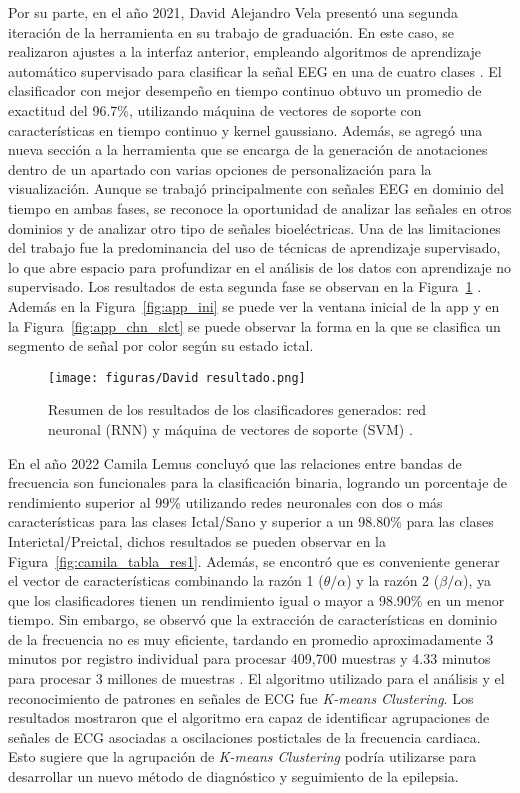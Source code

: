Por su parte, en el año 2021, David Alejandro Vela presentó una segunda iteración de la herramienta en su trabajo de graduación. En este caso, se realizaron ajustes a la interfaz anterior, empleando algoritmos de aprendizaje automático supervisado para clasificar la señal EEG en una de cuatro clases \cite{david_2022}. El clasificador con mejor desempeño en tiempo continuo obtuvo un promedio de exactitud del 96.7\%, utilizando máquina de vectores de soporte con características en tiempo continuo y kernel gaussiano. Además, se agregó una nueva sección a la herramienta que se encarga de la generación de anotaciones dentro de un apartado con varias opciones de personalización para la visualización. Aunque se trabajó principalmente con señales EEG en dominio del tiempo en ambas fases, se reconoce la oportunidad de analizar las señales en otros dominios y de analizar otro tipo de señales bioeléctricas. Una de las limitaciones del trabajo fue la predominancia del uso de técnicas de aprendizaje supervisado, lo que abre espacio para profundizar en el análisis de los datos con aprendizaje no supervisado. Los resultados de esta segunda fase se observan en la Figura~\ref{fig:mesh1} \cite{david_2022}. Además en la Figura~\ref{fig:app_ini} se puede ver la ventana inicial de la app y en la Figura~\ref{fig:app_chn_slct} se puede observar la forma en la que se clasifica un segmento de señal por color según su estado ictal.

\begin{figure}[t]
    \centering
    \texttt{[image: figuras/David resultado.png]}
    \caption{Resumen de los resultados de los clasificadores generados: red neuronal (RNN) y máquina de vectores de soporte (SVM) \cite{david_2022}.}
    \label{fig:mesh1}
\end{figure}

En el año 2022 Camila Lemus \cite{camila_2022} concluyó que las relaciones entre bandas de frecuencia son funcionales para la clasificación binaria, logrando un porcentaje de rendimiento superior al 99\% utilizando redes neuronales con dos o más características para las clases Ictal/Sano y superior a un 98.80\% para las clases Interictal/Preictal, dichos resultados se pueden observar en la Figura~\ref{fig:camila_tabla_res1}. Además, se encontró que es conveniente generar el vector de características combinando la razón 1 ($\theta/\alpha$) y la razón 2 ($\beta/\alpha$), ya que los clasificadores tienen un rendimiento igual o mayor a 98.90\% en un menor tiempo. Sin embargo, se observó que la extracción de características en dominio de la frecuencia no es muy eficiente, tardando en promedio aproximadamente 3 minutos por registro individual para procesar 409,700 muestras y 4.33 minutos para procesar 3 millones de muestras \cite{camila_2022}. El algoritmo utilizado para el análisis y el reconocimiento de patrones en señales de ECG fue \textit{K-means Clustering}. Los resultados mostraron que el algoritmo era capaz de identificar agrupaciones de señales de ECG asociadas a oscilaciones postictales de la frecuencia cardiaca. Esto sugiere que la agrupación de \textit{K-means Clustering} podría utilizarse para desarrollar un nuevo método de diagnóstico y seguimiento de la epilepsia.

